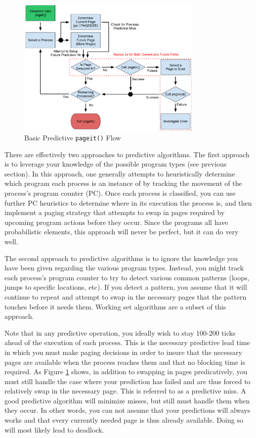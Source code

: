 \documentclass[12pt]{article}
\begin{document}
\begin{figure}[htbp]
  \begin{center}
    \includegraphics[width=0.8\textwidth]{pageit-Fig2.pdf}
    \caption{Basic Predictive \texttt{pageit()} Flow}
    \label{fig:pageit-predictive}
  \end{center}
\end{figure}

There are effectively two approaches to predictive algorithms. The
first approach is to leverage your knowledge of the possible program
types (see previous section). In this approach, one generally attempts
to heuristically determine which program each process is an instance of
by tracking the movement of the process's program counter (PC). Once each
process is classified, you can use further PC heuristics to determine where
in its execution the process is, and then implement a paging strategy
that attempts to swap in pages required by upcoming program actions
before they occur. Since the programs all have probabilistic elements,
this approach will never be perfect, but it can do very well.

The second approach to predictive algorithms is to ignore the
knowledge you have been given regarding the various program
types. Instead, you might track each process's program counter to try
to detect various common patterns (loops, jumps to specific locations,
etc). If you detect a pattern, you assume that it will continue to
repeat and attempt to swap in the necessary pages that the pattern
touches before it needs them. Working set algorithms are a subset of
this approach.

Note that in any predictive operation, you ideally wish to stay
100-200 ticks ahead of the execution of each process. This is the
necessary predictive lead time in which you must make paging decisions
in order to insure that the necessary pages are available when the
process reaches them and that no blocking time is required. As Figure
\ref{fig:pageit-predictive} shows, in addition to swapping in pages
predicatively, you must still handle the case where your prediction has
failed and are thus forced to relatively swap in the necessary
page. This is referred to as a predictive miss. A good predictive
algorithm will minimize misses, but still must handle them when they
occur. In other words, you can not assume that your predictions will
always works and that every currently needed page is thus already
available. Doing so will most likely lead to deadlock.
\end{document}
